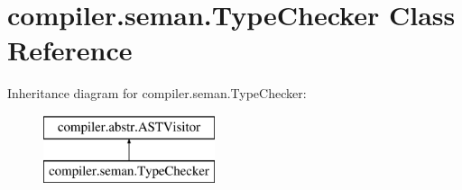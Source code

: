 \hypertarget{classcompiler_1_1seman_1_1_type_checker}{}\section{compiler.\+seman.\+Type\+Checker Class Reference}
\label{classcompiler_1_1seman_1_1_type_checker}
Inheritance diagram for compiler.\+seman.\+Type\+Checker\+:\begin{figure}[H]
\begin{center}
\leavevmode
\includegraphics[height=2.000000cm]{classcompiler_1_1seman_1_1_type_checker}
\end{center}
\end{figure}
